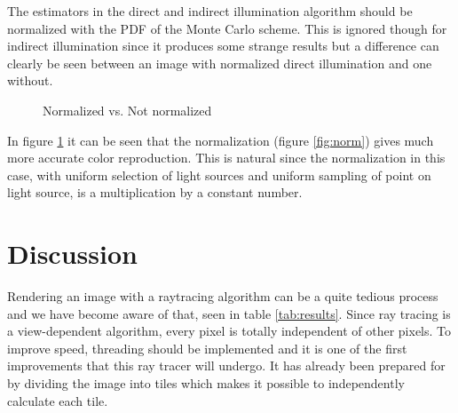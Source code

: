 \documentclass[a4paper]{report}
\begin{document}
The estimators in the direct and indirect illumination algorithm
should be normalized with the PDF of the Monte Carlo scheme. This is
ignored though for indirect illumination since it produces some
strange results but a difference can clearly be seen between an image
with normalized direct illumination and one without.

\begin{figure}[h]
  \centering
  \caption{Normalized vs. Not normalized}
  \label{fig:normcomp}
\end{figure}

In figure \ref{fig:normcomp} it can be seen that the normalization
(figure \ref{fig:norm}) gives much more accurate color
reproduction. This is natural since the normalization in this case,
with uniform selection of light sources and uniform sampling of
point on light source, is a multiplication by a constant number.

\chapter{Discussion}
\label{ch:discussion}

Rendering an image with a raytracing algorithm can be a quite tedious
process and we have become aware of that, seen in table
\ref{tab:results}. Since ray tracing is a view-dependent algorithm, every
pixel is totally independent of other pixels. To improve speed,
threading should be implemented and it
is one of the first improvements that this ray tracer will undergo. It
has already been prepared for by dividing the image into tiles which
makes it possible to independently calculate each tile.
\end{document}
